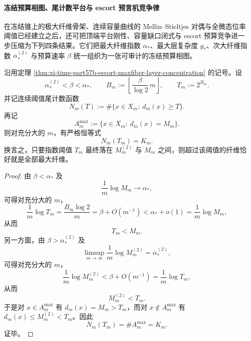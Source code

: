 \paragraph{冻结预算相图、尾计数平台与 escort 预言机竞争律}
在冻结锥上的极大纤维骨架、连续容量曲线的 Mellin--Stieltjes 对偶与全微态位率阈值已经建立之后，还可把顶端平台刚性、容量缺口闭式与 escort 预算竞争进一步压缩为下列四条结果。它们把最大纤维指数 \(\alpha_*\)、最大层复杂度 \(g_*\)、次大纤维指数 \(\alpha_*^{(2)}\) 与预算速率 \(\beta\) 统一组织为一张可审计的冻结预算相图。

\begin{theorem}[尾计数函数的顶端平台刚性]\label{thm:xi-time-part57ea-tailcount-top-platform-rigidity}
沿用定理 \ref{thm:xi-time-part57b-escort-maxfiber-layer-concentration} 的记号。设
\[
\alpha_*^{(2)}<\beta<\alpha_*,
\qquad
B_m:=\left\lfloor \frac{\beta}{\log 2}\,m\right\rfloor,
\qquad
T_m:=2^{B_m}.
\]
并记连续阈值尾计数函数
\[
N_m(T):=\#\{x\in X_m:\ d_m(x)\ge T\}.
\]
再记
\[
A_m^{\max}:=\{x\in X_m:\ d_m(x)=M_m\}.
\]
则对充分大的 \(m\)，有严格恒等式
\[
\boxed{\;
N_m(T_m)=K_m.\;}
\]
换言之，只要指数阈值 \(T_m\) 最终落在 \(M_m^{(2)}\) 与 \(M_m\) 之间，则超过该阈值的纤维恰好就是全部最大纤维。
\end{theorem}
\begin{proof}
由 \(\beta<\alpha_*\) 及
\[
\frac1m\log M_m\to\alpha_*,
\]
可得对充分大的 \(m\)，
\[
\frac1m\log T_m=\frac{B_m\log 2}{m}
=
\beta+O(m^{-1})
<
\alpha_*+o(1)
=
\frac1m\log M_m,
\]
从而
\[
T_m<M_m.
\]
另一方面，由 \(\beta>\alpha_*^{(2)}\) 及
\[
\limsup_{m\to\infty}\frac1m\log M_m^{(2)}=\alpha_*^{(2)},
\]
可得对充分大的 \(m\)，
\[
\frac1m\log M_m^{(2)}<\beta+O(m^{-1})=\frac1m\log T_m,
\]
从而
\[
M_m^{(2)}<T_m.
\]
于是对 \(x\in A_m^{\max}\) 有 \(d_m(x)=M_m>T_m\)，而对 \(x\notin A_m^{\max}\) 有 \(d_m(x)\le M_m^{(2)}<T_m\)。因此
\[
N_m(T_m)=\#A_m^{\max}=K_m.
\]
证毕。
\end{proof}

